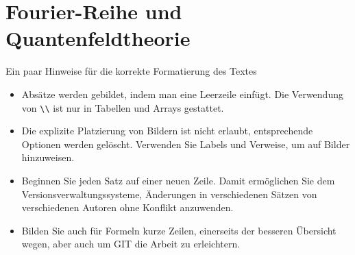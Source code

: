 %
%
%
%
\chapter{Fourier-Reihe und Quantenfeldtheorie\label{chapter:fourier}}
\begin{refsection}

Ein paar Hinweise für die korrekte Formatierung des Textes
\begin{itemize}
\item
Absätze werden gebildet, indem man eine Leerzeile einfügt.
Die Verwendung von \verb+\\+ ist nur in Tabellen und Arrays gestattet.
\item
Die explizite Platzierung von Bildern ist nicht erlaubt, entsprechende
Optionen werden gelöscht. 
Verwenden Sie Labels und Verweise, um auf Bilder hinzuweisen.
\item
Beginnen Sie jeden Satz auf einer neuen Zeile. 
Damit ermöglichen Sie dem Versionsverwaltungssysteme, Änderungen
in verschiedenen Sätzen von verschiedenen Autoren ohne Konflikt 
anzuwenden.
\item 
Bilden Sie auch für Formeln kurze Zeilen, einerseits der besseren
Übersicht wegen, aber auch um GIT die Arbeit zu erleichtern.
\end{itemize}







\printbibliography[heading=subbibliography]
\end{refsection}
